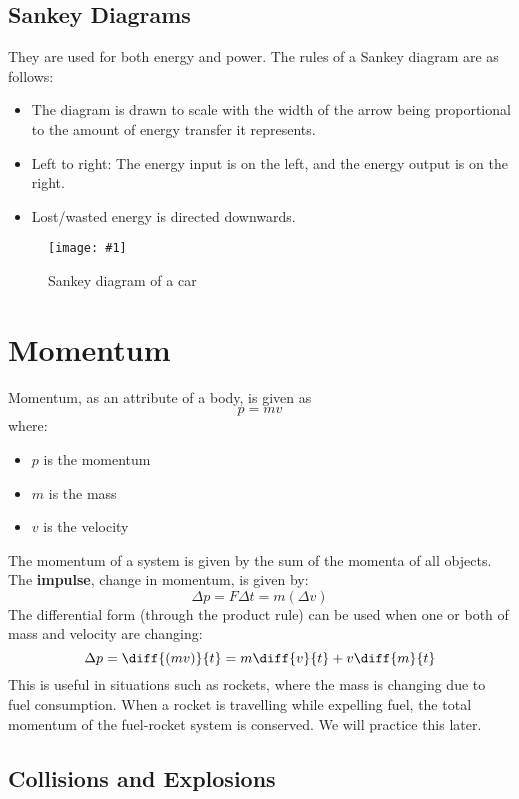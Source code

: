 \documentclass[a4paper,12pt]{article}
\let\oldsection\section
\renewcommand\section{\clearpage\oldsection}
\newcommand{\lb}{\\[8pt]}
\newcommand{\img}[4]{\begin{center}
  \begin{figure}[H]
    \centering
    \texttt{[image: \#1]}
    \caption{#3}
    \label{fig:#4}
  \end{figure}
\end{center}}
\begin{document}
\subsection{Sankey Diagrams}

They are used for both energy and power. The rules of a Sankey diagram are as follows:
\begin{itemize}
  \item The diagram is drawn to scale with the width of the arrow being proportional to the amount of energy transfer it represents.
  \item Left to right: The energy input is on the left, and the energy output is on the right.
  \item Lost/wasted energy is directed downwards.
\end{itemize}

\img{material/sankey.png}{0.5}{Sankey diagram of a car}{sankey}

\section{Momentum}

Momentum, as an attribute of a body, is given as
$$p = mv$$
where:
\begin{itemize}
  \item $p$ is the momentum
  \item $m$ is the mass
  \item $v$ is the velocity
\end{itemize}

The momentum of a system is given by the sum of the momenta of all objects.\lb
The \textbf{impulse}, change in momentum, is given by:
$$\Delta p = F \Delta t = m(\Delta v)$$
The differential form (through the product rule) can be used when one or both of mass and velocity are changing:
$$\Delta p = \diff{(mv)}{t} = m \diff{v}{t} + v \diff{m}{t}$$
This is useful in situations such as rockets, where the mass is changing due to fuel consumption. When a rocket is travelling while expelling fuel, the total momentum of the fuel-rocket system is conserved. We will practice this later.

\pagebreak

\subsection{Collisions and Explosions}
\end{document}
